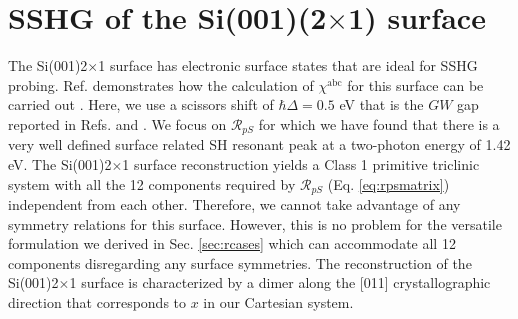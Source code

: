 \documentclass[aps,prb,10pt,showpacs,letterpaper,twocolumn]{revtex4-1}
\begin{document}

\section{SSHG of the
\texorpdfstring{S\lowercase{i}(001)(2$\times$1)}{Si(001)(2x1)} surface}
\label{sec:Si2x1}

The Si(001)2$\times$1 surface has electronic surface states that are ideal for
SSHG probing. Ref.  demonstrates how the calculation
of $\chi^{\mathrm{abc}}$ for this surface can be carried out . Here, we use a
scissors shift of $\hbar\Delta= 0.5$ eV that is the $GW$ gap reported in Refs.
 and . We focus on
$\mathcal{R}_{pS}$ for which we have found that there is a very well defined
surface related SH resonant peak at a two-photon energy of 1.42 eV. The
Si(001)2$\times$1 surface reconstruction yields a Class 1 primitive triclinic
system with all the 12 components required by $\mathcal{R}_{pS}$ (Eq.
\eqref{eq:rpsmatrix}) independent from each other.\cite{popovbook} Therefore, we
cannot take advantage of any symmetry relations for this surface. However, this
is no problem for the versatile formulation we derived in Sec. \ref{sec:rcases}
which can accommodate all 12 components disregarding any surface symmetries. The
reconstruction of the Si(001)2$\times$1 surface is characterized by a dimer
along the [011] crystallographic direction that corresponds to $x$ in our
Cartesian system.\cite{andersonPRB15}
\end{document}
